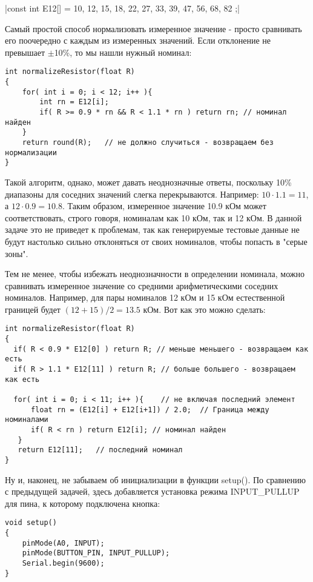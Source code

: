 |const int E12[] = {10, 12, 15, 18, 22, 27, 33, 39, 47, 56, 68, 82 };|

Самый простой способ нормализовать измеренное значение - просто сравнивать его поочередно с каждым из измеренных значений. Если отклонение не превышает $\pm$10\%, то мы нашли нужный номинал:

\begin{verbatim}
int normalizeResistor(float R)
{
    for( int i = 0; i < 12; i++ ){
        int rn = E12[i];
        if( R >= 0.9 * rn && R < 1.1 * rn ) return rn; // номинал найден
    }
    return round(R);   // не должно случиться - возвращаем без нормализации
}
\end{verbatim}
    
Такой алгоритм,  однако,  может давать неоднозначные ответы, поскольку 10\% диапазоны для соседних значений слегка перекрываются. Например: $10  \cdot  1.1 = 11$,  а $12 \cdot 0.9 = 10.8$. Таким образом, измеренное значение 10.9 кОм может соответствовать, строго говоря,  номиналам как 10 кОм, так и 12 кОм. В данной задаче это не приведет к проблемам, так как генерируемые тестовые данные не будут настолько сильно отклоняться от своих номиналов, чтобы попасть в "серые зоны".

Тем не менее, чтобы избежать неоднозначности в определении номинала, можно сравнивать измеренное значение со средними арифметическими соседних номиналов.  Например, для пары номиналов 12 кОм и 15 кОм естественной границей будет $(12+15)/2 = 13.5$ кОм. Вот как это можно сделать:

\begin{verbatim}
int normalizeResistor(float R)
{
  if( R < 0.9 * E12[0] ) return R; // меньше меньшего - возвращаем как есть  
  if( R > 1.1 * E12[11] ) return R; // больше большего - возвращаем как есть  

  for( int i = 0; i < 11; i++ ){    // не включая последний элемент
      float rn = (E12[i] + E12[i+1]) / 2.0;  // Граница между номиналами
      if( R < rn ) return E12[i]; // номинал найден
   }
   return E12[11];   // последний номинал
}
\end{verbatim}

Ну и, наконец, не забываем об инициализации в функции setup(). По сравнению с предыдущей задачей, здесь добавляется установка режима INPUT\_PULLUP для пина, к которому подключена кнопка:
\begin{verbatim}
void setup()
{
    pinMode(A0, INPUT);    
    pinMode(BUTTON_PIN, INPUT_PULLUP);
    Serial.begin(9600);
}
\end{verbatim}